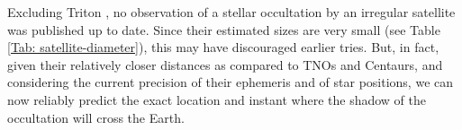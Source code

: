\documentclass[useAMS,usenatbib]{mn2e}
\begin{document}

Excluding Triton \citep{Olkin1997, Elliot_2000}, no observation of a stellar occultation by an irregular satellite was published up to date. Since their estimated sizes are very small (see Table \ref{Tab: satellite-diameter}), this may have discouraged earlier tries. But, in fact, given their relatively closer distances as compared to TNOs and Centaurs, and considering the current precision of their ephemeris and of star positions, we can now reliably predict the exact location and instant where the shadow of the occultation will cross the Earth. %
\end{document}
